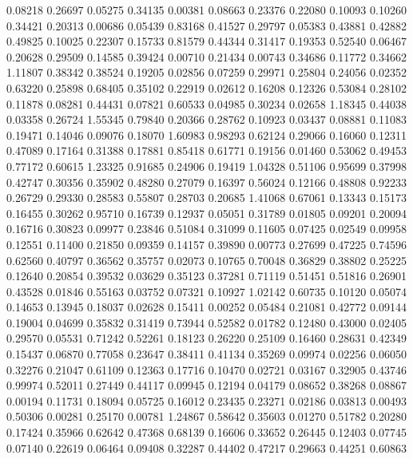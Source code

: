   0.08218 0.26697
  0.05275 0.34135
  0.00381 0.08663
  0.23376 0.22080
  0.10093 0.10260
  0.34421 0.20313
  0.00686 0.05439
  0.83168 0.41527
  0.29797 0.05383
  0.43881 0.42882
  0.49825 0.10025
  0.22307 0.15733
  0.81579 0.44344
  0.31417 0.19353
  0.52540 0.06467
  0.20628 0.29509
  0.14585 0.39424
  0.00710 0.21434
  0.00743 0.34686
  0.11772 0.34662
  1.11807 0.38342
  0.38524 0.19205
  0.02856 0.07259
  0.29971 0.25804
  0.24056 0.02352
  0.63220 0.25898
  0.68405 0.35102
  0.22919 0.02612
  0.16208 0.12326
  0.53084 0.28102
  0.11878 0.08281
  0.44431 0.07821
  0.60533 0.04985
  0.30234 0.02658
  1.18345 0.44038
  0.03358 0.26724
  1.55345 0.79840
  0.20366 0.28762
  0.10923 0.03437
  0.08881 0.11083
  0.19471 0.14046
  0.09076 0.18070
  1.60983 0.98293
  0.62124 0.29066
  0.16060 0.12311
  0.47089 0.17164
  0.31388 0.17881
  0.85418 0.61771
  0.19156 0.01460
  0.53062 0.49453
  0.77172 0.60615
  1.23325 0.91685
  0.24906 0.19419
  1.04328 0.51106
  0.95699 0.37998
  0.42747 0.30356
  0.35902 0.48280
  0.27079 0.16397
  0.56024 0.12166
  0.48808 0.92233
  0.26729 0.29330
  0.28583 0.55807
  0.28703 0.20685
  1.41068 0.67061
  0.13343 0.15173
  0.16455 0.30262
  0.95710 0.16739
  0.12937 0.05051
  0.31789 0.01805
  0.09201 0.20094
  0.16716 0.30823
  0.09977 0.23846
  0.51084 0.31099
  0.11605 0.07425
  0.02549 0.09958
  0.12551 0.11400
  0.21850 0.09359
  0.14157 0.39890
  0.00773 0.27699
  0.47225 0.74596
  0.62560 0.40797
  0.36562 0.35757
  0.02073 0.10765
  0.70048 0.36829
  0.38802 0.25225
  0.12640 0.20854
  0.39532 0.03629
  0.35123 0.37281
  0.71119 0.51451
  0.51816 0.26901
  0.43528 0.01846
  0.55163 0.03752
  0.07321 0.10927
  1.02142 0.60735
  0.10120 0.05074
  0.14653 0.13945
  0.18037 0.02628
  0.15411 0.00252
  0.05484 0.21081
  0.42772 0.09144
  0.19004 0.04699
  0.35832 0.31419
  0.73944 0.52582
  0.01782 0.12480
  0.43000 0.02405
  0.29570 0.05531
  0.71242 0.52261
  0.18123 0.26220
  0.25109 0.16460
  0.28631 0.42349
  0.15437 0.06870
  0.77058 0.23647
  0.38411 0.41134
  0.35269 0.09974
  0.02256 0.06050
  0.32276 0.21047
  0.61109 0.12363
  0.17716 0.10470
  0.02721 0.03167
  0.32905 0.43746
  0.99974 0.52011
  0.27449 0.44117
  0.09945 0.12194
  0.04179 0.08652
  0.38268 0.08867
  0.00194 0.11731
  0.18094 0.05725
  0.16012 0.23435
  0.23271 0.02186
  0.03813 0.00493
  0.50306 0.00281
  0.25170 0.00781
  1.24867 0.58642
  0.35603 0.01270
  0.51782 0.20280
  0.17424 0.35966
  0.62642 0.47368
  0.68139 0.16606
  0.33652 0.26445
  0.12403 0.07745
  0.07140 0.22619
  0.06464 0.09408
  0.32287 0.44402
  0.47217 0.29663
  0.44251 0.60863
